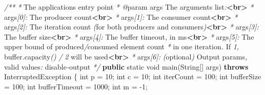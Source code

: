 \documentclass[11pt]{article}
\newenvironment{Shaded}{}{}
\newcommand{\KeywordTok}[1]{\textcolor[rgb]{0.00,0.44,0.13}{\textbf{{#1}}}}
\newcommand{\DataTypeTok}[1]{\textcolor[rgb]{0.56,0.13,0.00}{{#1}}}
\newcommand{\DecValTok}[1]{\textcolor[rgb]{0.25,0.63,0.44}{{#1}}}
\newcommand{\CommentTok}[1]{\textcolor[rgb]{0.38,0.63,0.69}{\textit{{#1}}}}
\newcommand{\FunctionTok}[1]{\textcolor[rgb]{0.02,0.16,0.49}{{#1}}}
\newcommand{\NormalTok}[1]{{#1}}
\newcommand{\OperatorTok}[1]{\textcolor[rgb]{0.40,0.40,0.40}{{#1}}}
\newcommand{\BuiltInTok}[1]{{#1}}
\begin{document}
\begin{Shaded}
\begin{Highlighting}[]
    \CommentTok{/**}
     \CommentTok{*}\NormalTok{ The application}\CommentTok{\textquotesingle{}}\NormalTok{s entry point}
\CommentTok{     * @}\NormalTok{param args The arguments list}\CommentTok{:}\KeywordTok{\textless{}br\textgreater{}}
     \CommentTok{*}\NormalTok{   args}\CommentTok{[0]:}\NormalTok{ The producer count}\KeywordTok{\textless{}br\textgreater{}}
     \CommentTok{*}\NormalTok{   args}\CommentTok{[1]:}\NormalTok{ The consumer count}\KeywordTok{\textless{}br\textgreater{}}
     \CommentTok{*}\NormalTok{   args}\CommentTok{[2]:}\NormalTok{ The iteration count }\CommentTok{(}\NormalTok{for both producers and consumers}\CommentTok{)}\KeywordTok{\textless{}br\textgreater{}}
     \CommentTok{*}\NormalTok{   args}\CommentTok{[3]:}\NormalTok{ The buffer size}\KeywordTok{\textless{}br\textgreater{}}
     \CommentTok{*}\NormalTok{   args}\CommentTok{[4]:}\NormalTok{ The buffer timeout}\CommentTok{,}\NormalTok{ in ms}\KeywordTok{\textless{}br\textgreater{}}
     \CommentTok{*}\NormalTok{   args}\CommentTok{[5]:}\NormalTok{ The upper bound of produced}\CommentTok{/}\NormalTok{consumed element count}
     \CommentTok{*}\NormalTok{            in one iteration}\CommentTok{.}\NormalTok{ If }\CommentTok{\textasciigrave{}{-}1\textasciigrave{},} \CommentTok{\textasciigrave{}}\NormalTok{buffer}\CommentTok{.}\NormalTok{capacity}\CommentTok{()} \CommentTok{/} \CommentTok{2\textasciigrave{}}\NormalTok{ will be used}\KeywordTok{\textless{}br\textgreater{}}
     \CommentTok{*}\NormalTok{   args}\CommentTok{[6]:} \CommentTok{(}\NormalTok{optional}\CommentTok{)}\NormalTok{ Output params}\CommentTok{,}\NormalTok{ valid values}\CommentTok{:} \CommentTok{\textquotesingle{}}\NormalTok{disable}\CommentTok{{-}}\NormalTok{output}\CommentTok{\textquotesingle{}}
     \CommentTok{*/}
    \KeywordTok{public} \DataTypeTok{static} \DataTypeTok{void} \FunctionTok{main}\OperatorTok{(}\BuiltInTok{String}\OperatorTok{[]}\NormalTok{ args}\OperatorTok{)} \KeywordTok{throws} \BuiltInTok{InterruptedException} \OperatorTok{\{}
        \DataTypeTok{int}\NormalTok{ p }\OperatorTok{=} \DecValTok{10}\OperatorTok{;}
        \DataTypeTok{int}\NormalTok{ c }\OperatorTok{=} \DecValTok{10}\OperatorTok{;}
        \DataTypeTok{int}\NormalTok{ iterCount }\OperatorTok{=} \DecValTok{100}\OperatorTok{;}
        \DataTypeTok{int}\NormalTok{ bufferSize }\OperatorTok{=} \DecValTok{100}\OperatorTok{;}
        \DataTypeTok{int}\NormalTok{ bufferTimeout }\OperatorTok{=} \DecValTok{1000}\OperatorTok{;}
        \DataTypeTok{int}\NormalTok{ m }\OperatorTok{=} \OperatorTok{{-}}\DecValTok{1}\OperatorTok{;}


\end{Highlighting}
\end{Shaded}
\end{document}
